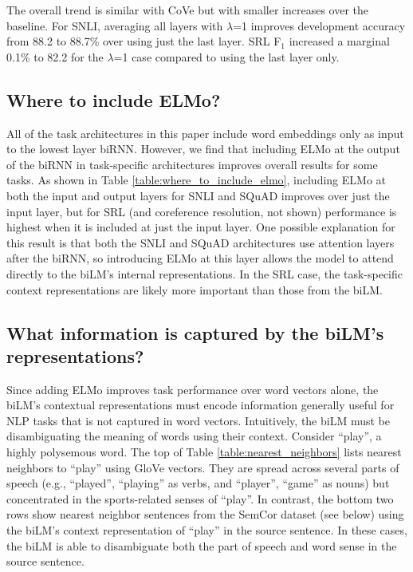 \documentclass[11pt,a4paper]{article}
\newcommand{\ELMO}{ELMo}
\begin{document}
The overall trend is similar with CoVe but with smaller increases over the baseline.
For SNLI, averaging all layers with $\lambda$=1 improves development accuracy from 88.2 to 88.7\% over using just the last layer.
SRL F$_1$ increased a marginal 0.1\% to 82.2 for the $\lambda$=1 case compared to using the last layer only.

\subsection{Where to include \ELMO?}
\label{sec:where_to_include_elmo}
All of the task architectures in this paper include word embeddings only as input to the lowest layer biRNN.
However, we find that including \ELMO{} at the output of the biRNN in task-specific architectures improves overall results for some tasks.
As shown in Table \ref{table:where_to_include_elmo}, including \ELMO{} at both the input and output layers for SNLI and SQuAD improves over just the input layer, but for SRL (and coreference resolution, not shown) performance is highest when it is included at just the input layer.
One possible explanation for this result is that both the SNLI and SQuAD architectures use attention layers after the biRNN, so introducing \ELMO{} at this layer allows the model to attend directly to the biLM's internal representations.
In the SRL case, the task-specific context representations are likely more important than those from the biLM.

\subsection{What information is captured by the biLM's representations?}
\label{sec:what_info_bilm}
Since adding \ELMO{} improves task performance over word vectors alone, the biLM's contextual representations must encode information generally useful for NLP tasks that is not captured in word vectors.  Intuitively, the biLM must be disambiguating the meaning of words using their context.
Consider ``play'', a highly polysemous word.  The top of Table \ref{table:nearest_neighbors} lists nearest neighbors to ``play'' using GloVe vectors.
They are spread across several parts of speech (e.g., ``played'', ``playing'' as verbs, and ``player'', ``game'' as nouns) but concentrated in the sports-related senses of ``play''.
In contrast, the bottom two rows show nearest neighbor sentences from the SemCor dataset (see below) using the biLM's context representation of ``play'' in the source sentence.
In these cases, the biLM is able to disambiguate both the part of speech and word sense in the source sentence.
\end{document}

